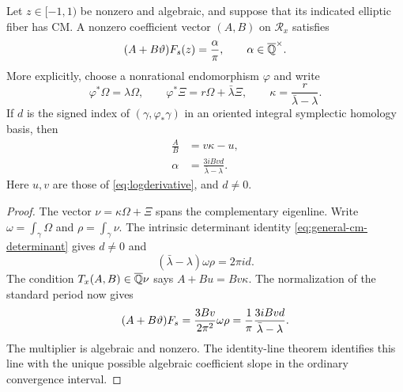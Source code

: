 \begin{proposition}
\label{prop:cm-matrix-certificate}
Let $z\in[-1,1)$ be nonzero and algebraic, and suppose that its indicated
elliptic fiber has CM.  A nonzero coefficient vector $(A,B)$ on
$\mathcal R_x$ satisfies
\[
                 (A+B\vartheta)F_s(z)=\frac\alpha\pi,
                 \qquad \alpha\in\overline{\mathbb Q}^\times.
\]
More explicitly, choose a nonrational endomorphism $\varphi$ and
write
\[
 \varphi^*\Omega=\lambda\Omega,\qquad
 \varphi^*\Xi=r\Omega+\bar\lambda\Xi,
 \qquad \kappa=\frac{r}{\bar\lambda-\lambda}.
\]
If $d$ is the signed index of
$(\gamma,\varphi_*\gamma)$ in an oriented integral symplectic
homology basis, then
\begin{align}
 \frac AB&=v\kappa-u,\label{eq:cm-matrix-slope}\\
 \alpha&=\frac{3iBvd}{\bar\lambda-\lambda}.
 \label{eq:cm-matrix-alpha}
\end{align}
Here $u,v$ are those of \eqref{eq:logderivative}, and $d\ne0$.
\end{proposition}
\begin{proof}
The vector $\nu=\kappa\Omega+\Xi$ spans the complementary
eigenline.  Write $\omega=\int_\gamma\Omega$ and
$\rho=\int_\gamma\nu$.  The intrinsic determinant identity
\eqref{eq:general-cm-determinant} gives $d\ne0$ and
\[
                  (\bar\lambda-\lambda)\omega\rho=2\pi i d.
\]
The condition $T_x(A,B)\in\overline{\mathbb Q}\nu$ says
$A+Bu=Bv\kappa$.  The normalization of the standard period now
gives
\[
 (A+B\vartheta)F_s
   =\frac{3Bv}{2\pi^2}\omega\rho
   =\frac1\pi\frac{3iBvd}{\bar\lambda-\lambda}.
\]
The multiplier is algebraic and nonzero.  The identity-line theorem
identifies this line with the unique possible algebraic coefficient
slope in the ordinary convergence interval.
\end{proof}

